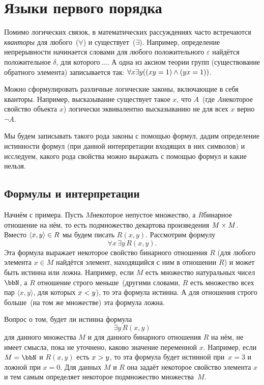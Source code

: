 \chapter{Языки первого порядка}
        \label{first-order-languages}%
Помимо логических связок, в математических рассуждениях часто
встречаются \emph{кванторы}%
 для
любого\ ($\forall$) и  существует\ ($\exists$).
Например, определение непрерывности начинается словами  для
любого положительного $\varepsilon$ найдётся положительное
$\delta$, для которого\,$\dots$. А одна из аксиом теории групп
(существование обратного элемента) записывается так:
$\forall x \exists y ((xy\hm=1)\land(yx\hm=1))$.

Можно сформулировать различные логические законы, включающие в
себя кванторы. Например, высказывание  существует такое $x$,
что $A$\ (где $A$\т некоторое свойство объекта $x$) логически
эквивалентно высказыванию  не для всех $x$ верно $\lnot
A$.

Мы будем записывать такого рода законы с помощью формул, дадим
определение истинности формул (при данной интерпретации входящих
в них символов) и исследуем, какого рода свойства можно выражать
с помощью формул и какие нельзя.

\section{Формулы и интерпретации}
        \label{formulas-and-structures}%
Начнём с примера. Пусть $M$\т некоторое непустое множество, а
$R$\т бинарное отношение на нём, то есть подмножество
декартова произведения $M\hm\times M$. Вместо $\langle x,y\rangle\hm\in R$
мы будем писать $R(x,y)$.
Рассмотрим формулу
        $$
\forall x\, \exists y\, R(x,y).
        $$
Эта формула выражает некоторое свойство бинарного отношения $R$
(для любого элемента $x\in M$ найдётся элемент, находящийся с
ним в отношении $R$) и может быть истинна или ложна. Например,
если $M$ есть множество натуральных чисел $\bbN$, а $R$\т
отношение  строго меньше\ (другими словами, $R$ есть
множество всех пар $\langle x,y\rangle$, для которых $x\hm<y$),
то эта формула истинна. А для отношения  строго больше\
(на том же множестве) эта формула ложна.

Вопрос о том, будет ли истинна формула
        $$
\exists y\, R(x,y)
        $$
для данного множества $M$ и для данного бинарного отношения $R$
на нём, не имеет смысла, пока не уточнено, каково значение
переменной $x$. Например, если $M=\bbN$ и $R(x,y)$ есть
$x\hm>y$, то эта формула будет истинной при~$x=3$ и ложной при
$x=0$. Для данных $M$ и $R$ она задаёт некоторое свойство
элемента $x$ и тем самым определяет некоторое подмножество
множества~$M$.

